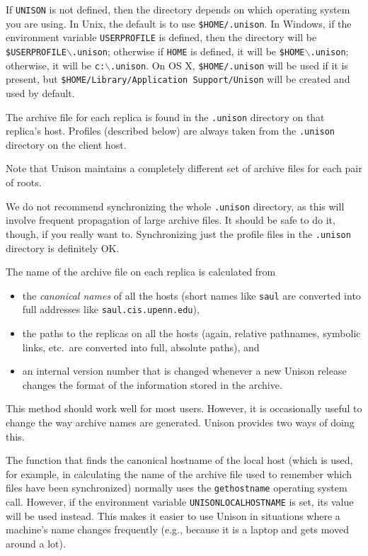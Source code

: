 \documentclass{article}
\begin{document}
If {\tt UNISON} is not defined, then the directory depends on which
operating system you are using.  In Unix, the default is to use
{\tt \$HOME/.unison}.
In Windows, if the environment variable
{\tt USERPROFILE} is defined, then the directory will be
{\tt \$USERPROFILE$\backslash$.unison};
otherwise if {\tt HOME} is defined, it will be
{\tt \$HOME$\backslash$.unison};
otherwise, it will be
{\tt c:$\backslash$.unison}.
On OS X,
{\tt \$HOME/.unison} will be used if it is present, but
{\tt \$HOME/Library/Application Support/Unison} will be created and used by
default.

The archive file for each replica is found in the {\tt .unison}
directory on that replica's host.  Profiles (described below) are
always taken from the {\tt .unison} directory on the client host.

Note that Unison maintains a completely different set of archive files
for each pair of roots.

We do not recommend synchronizing the whole {\tt .unison} directory, as this
will involve frequent propagation of large archive files.  It should be safe
to do it, though, if you really want to.  Synchronizing just the profile
files in the {\tt .unison} directory is definitely OK.



The name of the archive file on each replica is calculated from
\begin{itemize}
\item the {\em canonical names} of all the hosts (short names like
  \verb|saul| are converted into full addresses like \verb|saul.cis.upenn.edu|),
\item the paths to the replicas on all the hosts (again, relative
  pathnames, symbolic links, etc.\ are converted into full, absolute paths), and
\item an internal version number that is changed whenever a new Unison
  release changes the format of the information stored in the archive.
\end{itemize}
This method should work well for most users.  However, it is occasionally
useful to change the way archive names are generated.  Unison provides
two ways of doing this.

The function that finds the canonical hostname of the local host (which
is used, for example, in calculating the name of the archive file used to
remember which files have been synchronized) normally uses the
\verb|gethostname| operating system call.  However, if the environment
variable \verb|UNISONLOCALHOSTNAME| is set, its value will be used
instead.  This makes it easier to use Unison in situations where a
machine's name changes frequently (e.g., because it is a laptop and gets
moved around a lot).
\end{document}
